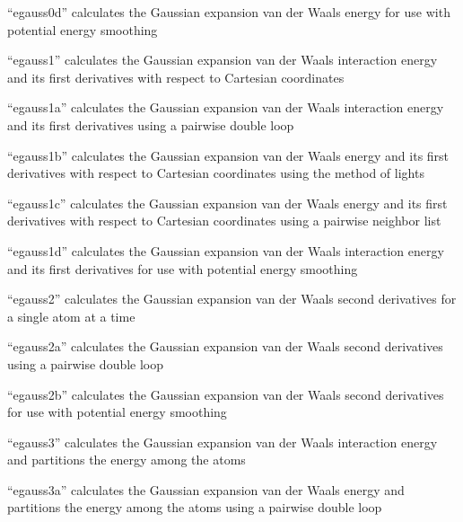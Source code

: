 \documentclass[letterpaper,11pt,english]{sphinxmanual}
\begin{document}
“egauss0d” calculates the Gaussian expansion van der Waals
energy for use with potential energy smoothing


“egauss1” calculates the Gaussian expansion van der Waals
interaction energy and its first derivatives with respect
to Cartesian coordinates


“egauss1a” calculates the Gaussian expansion van der Waals
interaction energy and its first derivatives using a pairwise
double loop


“egauss1b” calculates the Gaussian expansion van der Waals
energy and its first derivatives with respect to Cartesian
coordinates using the method of lights


“egauss1c” calculates the Gaussian expansion van der Waals
energy and its first derivatives with respect to Cartesian
coordinates using a pairwise neighbor list


“egauss1d” calculates the Gaussian expansion van der Waals
interaction energy and its first derivatives for use with
potential energy smoothing


“egauss2” calculates the Gaussian expansion van der Waals
second derivatives for a single atom at a time


“egauss2a” calculates the Gaussian expansion van der Waals
second derivatives using a pairwise double loop


“egauss2b” calculates the Gaussian expansion van der Waals
second derivatives for use with potential energy smoothing


“egauss3” calculates the Gaussian expansion van der Waals
interaction energy and partitions the energy among the atoms


“egauss3a” calculates the Gaussian expansion van der Waals
energy and partitions the energy among the atoms using a
pairwise double loop
\end{document}

